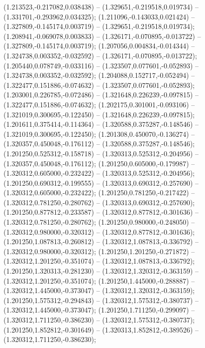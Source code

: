  (1.213523,-0.217082,0.038438) -- (1.329651,-0.219518,0.019734) -- (1.331701,-0.293962,0.034325);
 (1.211096,-0.143033,0.021424) -- (1.327809,-0.145174,0.003719) -- (1.329651,-0.219518,0.019734);
 (1.208941,-0.069078,0.003833) -- (1.326171,-0.070895,-0.013722) -- (1.327809,-0.145174,0.003719);
 (1.207056,0.004834,-0.014344) -- (1.324738,0.003352,-0.032592) -- (1.326171,-0.070895,-0.013722);
 (1.205440,0.078749,-0.033116) -- (1.323507,0.077601,-0.052893) -- (1.324738,0.003352,-0.032592);
 (1.204088,0.152717,-0.052494) -- (1.322477,0.151886,-0.074632) -- (1.323507,0.077601,-0.052893);
 (1.203001,0.226785,-0.072486) -- (1.321648,0.226239,-0.097815) -- (1.322477,0.151886,-0.074632);
 (1.202175,0.301001,-0.093106) -- (1.321019,0.300695,-0.122450) -- (1.321648,0.226239,-0.097815);
 (1.201611,0.375414,-0.114364) -- (1.320588,0.375287,-0.148546) -- (1.321019,0.300695,-0.122450);
 (1.201308,0.450070,-0.136274) -- (1.320357,0.450048,-0.176112) -- (1.320588,0.375287,-0.148546);
 (1.201250,0.525312,-0.158718) -- (1.320313,0.525312,-0.204956) -- (1.320357,0.450048,-0.176112);
 (1.201250,0.605000,-0.179987) -- (1.320312,0.605000,-0.232422) -- (1.320313,0.525312,-0.204956);
 (1.201250,0.690312,-0.199555) -- (1.320313,0.690312,-0.257690) -- (1.320312,0.605000,-0.232422);
 (1.201250,0.781250,-0.217422) -- (1.320312,0.781250,-0.280762) -- (1.320313,0.690312,-0.257690);
 (1.201250,0.877812,-0.233587) -- (1.320312,0.877812,-0.301636) -- (1.320312,0.781250,-0.280762);
 (1.201250,0.980000,-0.248050) -- (1.320312,0.980000,-0.320312) -- (1.320312,0.877812,-0.301636);
 (1.201250,1.087813,-0.260812) -- (1.320312,1.087813,-0.336792) -- (1.320312,0.980000,-0.320312);
 (1.201250,1.201250,-0.271872) -- (1.320312,1.201250,-0.351074) -- (1.320312,1.087813,-0.336792);
 (1.201250,1.320313,-0.281230) -- (1.320312,1.320312,-0.363159) -- (1.320312,1.201250,-0.351074);
 (1.201250,1.445000,-0.288887) -- (1.320312,1.445000,-0.373047) -- (1.320312,1.320312,-0.363159);
 (1.201250,1.575312,-0.294843) -- (1.320312,1.575312,-0.380737) -- (1.320312,1.445000,-0.373047);
 (1.201250,1.711250,-0.299097) -- (1.320312,1.711250,-0.386230) -- (1.320312,1.575312,-0.380737);
 (1.201250,1.852812,-0.301649) -- (1.320313,1.852812,-0.389526) -- (1.320312,1.711250,-0.386230);
